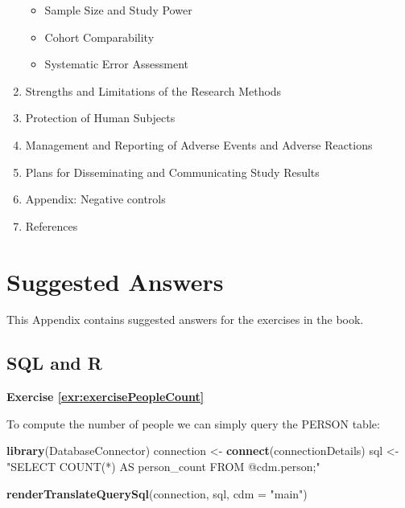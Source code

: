 \documentclass[11pt]{book}
\newenvironment{Shaded}{\begin{snugshade}}{\end{snugshade}}
\newcommand{\DataTypeTok}[1]{\textcolor[rgb]{0.13,0.29,0.53}{#1}}
\newcommand{\KeywordTok}[1]{\textcolor[rgb]{0.13,0.29,0.53}{\textbf{#1}}}
\newcommand{\NormalTok}[1]{#1}
\newcommand{\StringTok}[1]{\textcolor[rgb]{0.31,0.60,0.02}{#1}}
\providecommand{\tightlist}{%
  \setlength{\itemsep}{0pt}\setlength{\parskip}{0pt}}
\theoremstyle{definition}
\theoremstyle{definition}
\theoremstyle{definition}
\theoremstyle{remark}
\begin{document}
\begin{enumerate}
  \begin{itemize}
  \tightlist
  \item
    Sample Size and Study Power\\
  \item
    Cohort Comparability\\
  \item
    Systematic Error Assessment\\
  \end{itemize}
\item
  Strengths and Limitations of the Research Methods\\
\item
  Protection of Human Subjects\\
\item
  Management and Reporting of Adverse Events and Adverse Reactions\\
\item
  Plans for Disseminating and Communicating Study Results
\item
  Appendix: Negative controls
\item
  References
\end{enumerate}

\hypertarget{SuggestedAnswers}{%
\chapter{Suggested Answers}\label{SuggestedAnswers}}

This Appendix contains suggested answers for the exercises in the book.

\hypertarget{SqlAndRanswers}{%
\section{SQL and R}\label{SqlAndRanswers}}

\textbf{Exercise \ref{exr:exercisePeopleCount}}

To compute the number of people we can simply query the PERSON table:

\begin{Shaded}
\begin{Highlighting}[]
\KeywordTok{library}\NormalTok{(DatabaseConnector)}
\NormalTok{connection <-}\StringTok{ }\KeywordTok{connect}\NormalTok{(connectionDetails)}
\NormalTok{sql <-}\StringTok{ "SELECT COUNT(*) AS person_count}
\StringTok{FROM @cdm.person;"}

\KeywordTok{renderTranslateQuerySql}\NormalTok{(connection, sql, }\DataTypeTok{cdm =} \StringTok{"main"}\NormalTok{)}
\end{Highlighting}
\end{Shaded}
\end{document}
